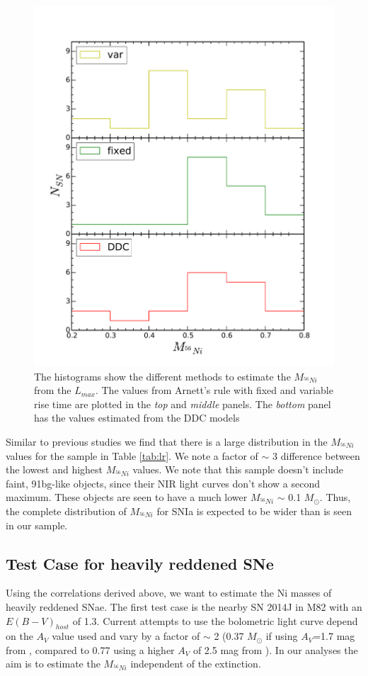 
\begin{figure}
\includegraphics[width=.5\textwidth, trim= 0 30 0 30]{../plot_rel/hist_ni.pdf}
\caption{The histograms show the different methods to estimate the $M_{^{56}Ni}$ from the $L_{max}$. The values from Arnett's rule with fixed and variable rise time are plotted in the \emph{top} and \emph{middle} panels. The \emph{bottom} panel has the values estimated from the DDC models}
\label{fig:nicomp}
\end{figure}


Similar to previous studies we find that there is a large distribution in the $M_{^{56}Ni}$ values for the sample in Table \ref{tab:lr}. We note a factor of $\sim$ 3 difference between the lowest and highest $M_{^{56}Ni}$ values. We note that this sample doesn't include faint, 91bg-like objects, since their NIR light curves don't show a second maximum. These objects are seen to have a much lower $M_{^{56}Ni}$ $\sim$ 0.1 $M_{\odot}$. Thus, the complete distribution of $M_{^{56}Ni}$ for SNIa is expected to be wider than is seen in our sample.



\subsection{Test Case for heavily reddened SNe}
Using the correlations derived above, we want to estimate the Ni masses of heavily reddened SNae. The first test case is the nearby SN 2014J in M82 with an $E(B-V)_{host}$ of 1.3. 
Current attempts to use the bolometric light curve depend on the $A_V$ value used and vary by a factor of $\sim$ 2
 (0.37 $M_{\odot}$ if using $A_V$=1.7 mag from \citet{Margutti2014}, compared to 0.77 using a higher $A_V$ of 2.5 mag from \citet{Goobar2014}).  In our analyses the aim is to 
 estimate the $M_{^{56}Ni}$ independent of the extinction.

